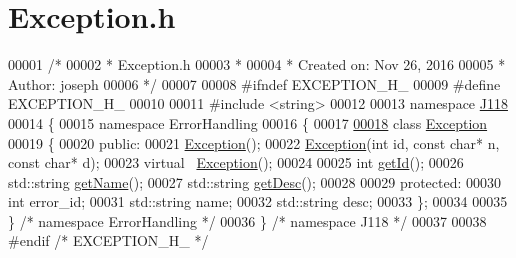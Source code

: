 \hypertarget{_exception_8h_source}{}\section{Exception.\+h}
\label{_exception_8h_source}

\begin{DoxyCode}
00001 \textcolor{comment}{/*}
00002 \textcolor{comment}{ * Exception.h}
00003 \textcolor{comment}{ *}
00004 \textcolor{comment}{ *  Created on: Nov 26, 2016}
00005 \textcolor{comment}{ *      Author: joseph}
00006 \textcolor{comment}{ */}
00007 
00008 \textcolor{preprocessor}{#ifndef EXCEPTION\_H\_}
00009 \textcolor{preprocessor}{#define EXCEPTION\_H\_}
00010 
00011 \textcolor{preprocessor}{#include <string>}
00012 
00013 \textcolor{keyword}{namespace }\hyperlink{namespace_j118}{J118}
00014 \{
00015 \textcolor{keyword}{namespace }ErrorHandling
00016 \{
00017 
\hypertarget{_exception_8h_source_l00018}{}\hyperlink{class_j118_1_1_error_handling_1_1_exception}{00018} \textcolor{keyword}{class }\hyperlink{class_j118_1_1_error_handling_1_1_exception}{Exception}
00019 \{
00020 \textcolor{keyword}{public}:
00021     \hyperlink{class_j118_1_1_error_handling_1_1_exception_ad198efcdbab0bfcc391be37faa902b7c}{Exception}();
00022     \hyperlink{class_j118_1_1_error_handling_1_1_exception_ad198efcdbab0bfcc391be37faa902b7c}{Exception}(\textcolor{keywordtype}{int} \textcolor{keywordtype}{id}, \textcolor{keyword}{const} \textcolor{keywordtype}{char}* n, \textcolor{keyword}{const} \textcolor{keywordtype}{char}* d);
00023     \textcolor{keyword}{virtual} ~\hyperlink{class_j118_1_1_error_handling_1_1_exception}{Exception}();
00024 
00025     \textcolor{keywordtype}{int} \hyperlink{class_j118_1_1_error_handling_1_1_exception_a23cb87bd08a68063b4631fcb0a0ce813}{getId}();
00026     std::string \hyperlink{class_j118_1_1_error_handling_1_1_exception_ad60486b9b68b001eb8141a951da92b46}{getName}();
00027     std::string \hyperlink{class_j118_1_1_error_handling_1_1_exception_a94983c1a3e04e1d2fd3a9db88eadd836}{getDesc}();
00028 
00029 \textcolor{keyword}{protected}:
00030     \textcolor{keywordtype}{int} error\_id;
00031     std::string name;
00032     std::string desc;
00033 \};
00034 
00035 \} \textcolor{comment}{/* namespace ErrorHandling */}
00036 \} \textcolor{comment}{/* namespace J118 */}
00037 
00038 \textcolor{preprocessor}{#endif }\textcolor{comment}{/* EXCEPTION\_H\_ */}\textcolor{preprocessor}{}
\end{DoxyCode}
